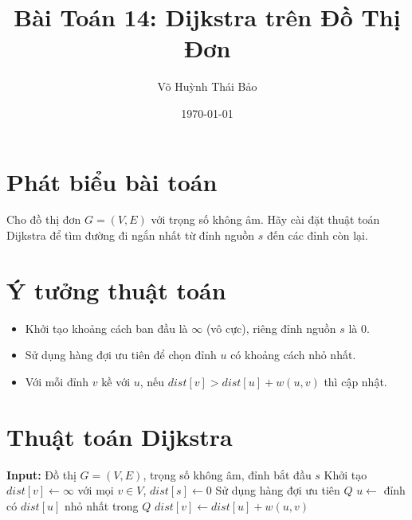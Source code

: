 \documentclass[12pt,a4paper]{article}
\title{Bài Toán 14: Dijkstra trên Đồ Thị Đơn}
\author{Võ Huỳnh Thái Bảo}
\date{\today}
\begin{document}
\maketitle

\section*{Phát biểu bài toán}
Cho đồ thị đơn $G = (V, E)$ với trọng số không âm. Hãy cài đặt thuật toán Dijkstra để tìm đường đi ngắn nhất từ đỉnh nguồn $s$ đến các đỉnh còn lại.

\section*{Ý tưởng thuật toán}
\begin{itemize}
  \item Khởi tạo khoảng cách ban đầu là $\infty$ (vô cực), riêng đỉnh nguồn $s$ là $0$.
  \item Sử dụng hàng đợi ưu tiên để chọn đỉnh $u$ có khoảng cách nhỏ nhất.
  \item Với mỗi đỉnh $v$ kề với $u$, nếu $dist[v] > dist[u] + w(u,v)$ thì cập nhật.
\end{itemize}

\section*{Thuật toán Dijkstra}
\begin{algorithmic}
\State \textbf{Input:} Đồ thị $G = (V, E)$, trọng số không âm, đỉnh bắt đầu $s$
\State Khởi tạo $dist[v] \gets \infty$ với mọi $v \in V$, $dist[s] \gets 0$
\State Sử dụng hàng đợi ưu tiên $Q$
  \State $u \gets$ đỉnh có $dist[u]$ nhỏ nhất trong $Q$
      \State $dist[v] \gets dist[u] + w(u,v)$
    \EndIf
  \EndFor
\EndWhile
\end{algorithmic}
\end{document}
